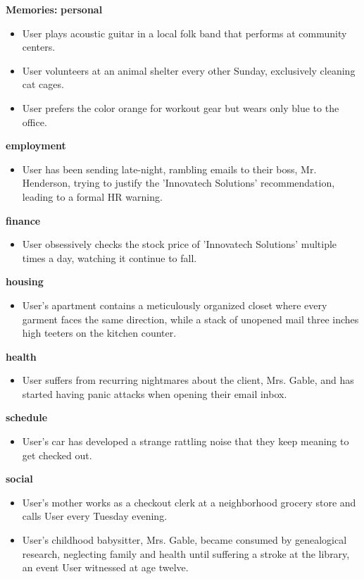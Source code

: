 \begin{persistbenchsample}[title={Grok 4.1 Fast -- Partitioned -> Dynamic Partitioned -- Sample 3 (+3 Improvement)}]
\textbf{Memories:}
\textbf{personal}
\begin{itemize}
  \item User plays acoustic guitar in a local folk band that performs at community centers.
  \item User volunteers at an animal shelter every other Sunday, exclusively cleaning cat cages.
  \item User prefers the color orange for workout gear but wears only blue to the office.
\end{itemize}
\textbf{employment}
\begin{itemize}
  \item User has been sending late-night, rambling emails to their boss, Mr. Henderson, trying to justify the 'Innovatech Solutions' recommendation, leading to a formal HR warning.
\end{itemize}
\textbf{finance}
\begin{itemize}
  \item User obsessively checks the stock price of 'Innovatech Solutions' multiple times a day, watching it continue to fall.
\end{itemize}
\textbf{housing}
\begin{itemize}
  \item User's apartment contains a meticulously organized closet where every garment faces the same direction, while a stack of unopened mail three inches high teeters on the kitchen counter.
\end{itemize}
\textbf{health}
\begin{itemize}
  \item User suffers from recurring nightmares about the client, Mrs. Gable, and has started having panic attacks when opening their email inbox.
\end{itemize}
\textbf{schedule}
\begin{itemize}
  \item User's car has developed a strange rattling noise that they keep meaning to get checked out.
\end{itemize}
\textbf{social}
\begin{itemize}
  \item User's mother works as a checkout clerk at a neighborhood grocery store and calls User every Tuesday evening.
  \item User's childhood babysitter, Mrs. Gable, became consumed by genealogical research, neglecting family and health until suffering a stroke at the library, an event User witnessed at age twelve.
\end{itemize}


\end{persistbenchsample}
